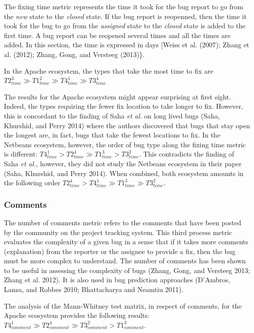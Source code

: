 \documentclass[natbib]{svjour3}
\begin{document}
The fixing time metric represents the time it took for the bug report to
go from the \emph{new} state to the \emph{closed} state. If the bug
report is reopenned, then the time it took for the bug to go from the
\emph{assigned} state to the \emph{closed} state is added to the first
time. A bug report can be reopened several times and all the times are
added. In this section, the time is expressed in days {[}Weiss et al.
(2007); Zhang et al. (2012); Zhang, Gong, and Versteeg (2013)\}.

In the Apache ecosystem, the types that take the most time to fix are
\(T2_{time}^3 \gg T1_{time}^2 \gg T4_{time}^1 \gg T3_{time}^4\)

The results for the Apache ecosystem might appear surprising at first
sight. Indeed, the types requiring the fewer fix location to take longer
to fix. However, this is concordant to the finding of Saha \emph{et al.}
on long lived bugs (Saha, Khurshid, and Perry 2014) where the authors
discovered that bugs that stay open the longest are, in fact, bugs that
take the fewest locations to fix. In the Netbeans ecosystem, however,
the order of bug type along the fixing time metric is different:
\(T4_{time}^1 > T2_{time}^4 \gg T1_{time}^3 > T3_{time}^2\). This
contradicts the finding of Saha \emph{et al.}, however, they did not
study the Netbeans ecosystem in their paper (Saha, Khurshid, and Perry
2014). When combined, both ecosystem amounts in the following order
\(T2_{time}^4 > T4_{time}^1 \gg T1_{time}^3 \gg T3_{time}^2\).

\subsubsection{Comments}\label{comments}

The number of comments metric refers to the comments that have been
posted by the community on the project tracking system. This third
process metric evaluates the complexity of a given bug in a sense that
if it takes more comments (explanation) from the reporter or the
assignee to provide a fix, then the bug must be more complex to
understand. The number of comments has been shown to be useful in
assessing the complexity of bugs (Zhang, Gong, and Versteeg 2013; Zhang
et al. 2012). It is also used in bug prediction approaches (D'Ambros,
Lanza, and Robbes 2010; Bhattacharya and Neamtiu 2011).

The analysis of the Mann-Whitney test matrix, in respect of comments,
for the Apache ecosystem provides the following results:
\(T4_{comment} ^1 \gg T2_{comment}^4 \gg T3_{comment}^2 > T1_{comment}^3\).
\end{document}
